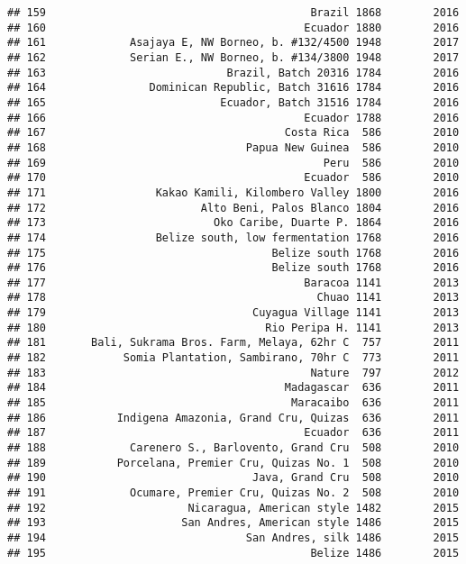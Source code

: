 \documentclass[
]{article}
\begin{document}
\begin{verbatim}
## 159                                         Brazil 1868        2016
## 160                                        Ecuador 1880        2016
## 161             Asajaya E, NW Borneo, b. #132/4500 1948        2017
## 162             Serian E., NW Borneo, b. #134/3800 1948        2017
## 163                            Brazil, Batch 20316 1784        2016
## 164                Dominican Republic, Batch 31616 1784        2016
## 165                           Ecuador, Batch 31516 1784        2016
## 166                                        Ecuador 1788        2016
## 167                                     Costa Rica  586        2010
## 168                               Papua New Guinea  586        2010
## 169                                           Peru  586        2010
## 170                                        Ecuador  586        2010
## 171                 Kakao Kamili, Kilombero Valley 1800        2016
## 172                        Alto Beni, Palos Blanco 1804        2016
## 173                          Oko Caribe, Duarte P. 1864        2016
## 174                 Belize south, low fermentation 1768        2016
## 175                                   Belize south 1768        2016
## 176                                   Belize south 1768        2016
## 177                                        Baracoa 1141        2013
## 178                                          Chuao 1141        2013
## 179                                Cuyagua Village 1141        2013
## 180                                  Rio Peripa H. 1141        2013
## 181       Bali, Sukrama Bros. Farm, Melaya, 62hr C  757        2011
## 182            Somia Plantation, Sambirano, 70hr C  773        2011
## 183                                         Nature  797        2012
## 184                                     Madagascar  636        2011
## 185                                      Maracaibo  636        2011
## 186           Indigena Amazonia, Grand Cru, Quizas  636        2011
## 187                                        Ecuador  636        2011
## 188             Carenero S., Barlovento, Grand Cru  508        2010
## 189           Porcelana, Premier Cru, Quizas No. 1  508        2010
## 190                                Java, Grand Cru  508        2010
## 191             Ocumare, Premier Cru, Quizas No. 2  508        2010
## 192                      Nicaragua, American style 1482        2015
## 193                     San Andres, American style 1486        2015
## 194                               San Andres, silk 1486        2015
## 195                                         Belize 1486        2015

\end{verbatim}
\end{document}
